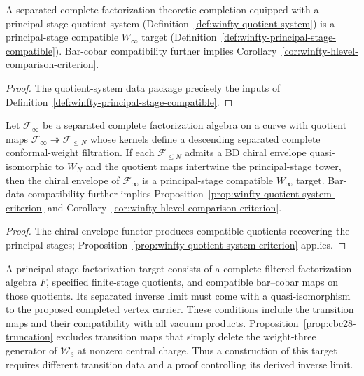 \begin{proposition}
\label{prop:winfty-quotient-system-criterion}
A separated complete factorization-theoretic completion equipped with a
principal-stage quotient system
(Definition~\ref{def:winfty-quotient-system}) is a principal-stage
compatible $W_\infty$ target
(Definition~\ref{def:winfty-principal-stage-compatible}).
Bar-cobar compatibility further implies
Corollary~\ref{cor:winfty-hlevel-comparison-criterion}.
\end{proposition}

\begin{proof}
The quotient-system data package precisely the inputs of Definition~\ref{def:winfty-principal-stage-compatible}.
\end{proof}

\begin{proposition}
\label{prop:winfty-factorization-envelope-criterion}
Let $\mathcal{F}_\infty$ be a separated complete factorization algebra
on a curve with quotient maps
$\mathcal{F}_\infty \twoheadrightarrow \mathcal{F}_{\le N}$
whose kernels define a descending separated complete conformal-weight
filtration.  If each $\mathcal{F}_{\le N}$ admits a BD chiral envelope
quasi-isomorphic to $W_N$ and the quotient maps intertwine the
principal-stage tower, then the chiral envelope of
$\mathcal{F}_\infty$ is a principal-stage compatible $W_\infty$ target.
Bar-data compatibility further implies
Proposition~\ref{prop:winfty-quotient-system-criterion} and
Corollary~\ref{cor:winfty-hlevel-comparison-criterion}.
\end{proposition}

\begin{proof}
The chiral-envelope functor produces compatible quotients recovering the principal stages; Proposition~\ref{prop:winfty-quotient-system-criterion} applies.
\end{proof}

\begin{definition}
\label{prop:winfty-factorization-package}
A principal-stage factorization target consists of a complete filtered factorization algebra $F$, specified finite-stage quotients, and compatible bar--cobar maps on those quotients.
Its separated inverse limit must come with a quasi-isomorphism to the proposed completed vertex carrier.
These conditions include the transition maps and their compatibility with all vacuum products.
Proposition~\ref{prop:cbc28-truncation} excludes transition maps that simply delete the weight-three generator of $\mathcal W_3$ at nonzero central charge.
Thus a construction of this target requires different transition data and a proof controlling its derived inverse limit.
\end{definition}

